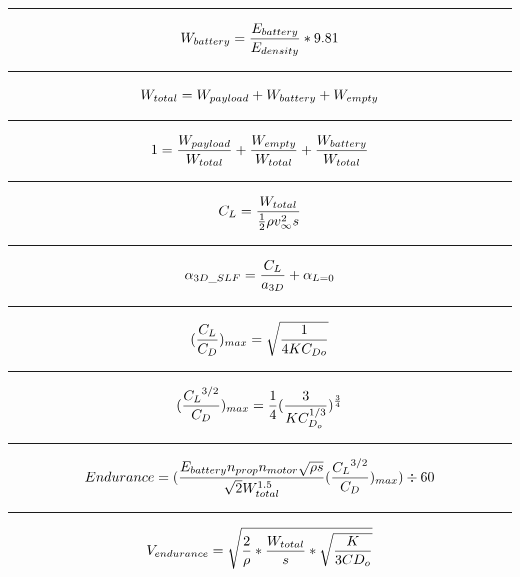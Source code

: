 \documentclass[12pt,A4paper]{article}
\begin{document}
		\hrule
		\vspace{0.1 in}
		\begin{equation}
			W_{battery} = \frac{E_{battery}}{E_{density}} *9.81 \\
		\end{equation}
		\hrule
		\vspace{0.1 in}
		\begin{equation}
			W_{total} = W_{payload} + W_{battery} + W_{empty} \\
		\end{equation}
		\hrule
		\vspace{0.1 in}
		\begin{equation}
			1 = \frac{W_{payload}}{W_{total}} + \frac{W_{empty}}{W_{total}} + \frac{W_{battery}}{W_{total}}\\
		\end{equation}
		\hrule
		\vspace{0.1 in}
		\begin{equation}
			C_L = \frac{W_{total}}{\frac{1}{2} \rho  v_\infty^2  s} \\
		\end{equation}
		\hrule
		\vspace{0.1 in}
		\begin{equation}
			\alpha_{3D\_SLF} = \frac{C_L}{a_{3D}}+\alpha_{L=0} \\
		\end{equation}
		\hrule
		\vspace{0.1 in}
		\begin{equation}
			(\frac{C_L}{C_D})_{max} = \sqrt{\frac{1}{4 K C_{D o}}} \\
		\end{equation}
		\hrule
		\vspace{0.1 in}
		\begin{equation}
			(\frac{{C_L}^{3/2}}{C_D})_{max} = \frac{1}{4} (\frac{3}{K C_{D_o}^{1/3}})^{\frac{3}{4}} \\
		\end{equation}
		\hrule
		\vspace{0.1 in}
		\begin{equation}
			Endurance = (\frac{E_{battery} n_{prop} n_{motor} \sqrt{\rho s}}{\sqrt{2} W_{total}^{1.5}} (\frac{{C_L}^{3/2}}{C_D})_{max}) \div 60 \\
		\end{equation}
		\hrule
		\vspace{0.1 in}
		\begin{equation}
			V_{endurance} = \sqrt{\frac{2}{\rho} * \frac{W_{total}}{s} * \sqrt{\frac{K}{3  CD_o}}} \\
		\end{equation}
\end{document}
